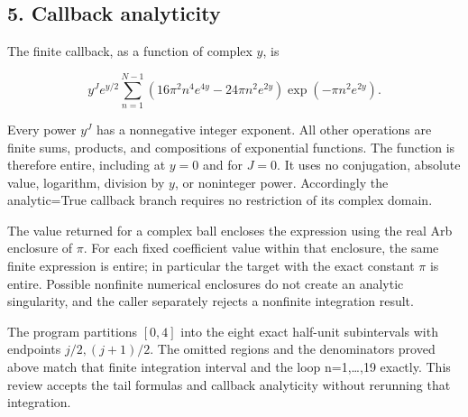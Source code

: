 \subsection{5. Callback analyticity}\label{callback-analyticity}

The finite callback, as a function of complex \(y\), is

\[
y^Je^{y/2}
\sum_{n=1}^{N-1}
\left(16\pi^2n^4e^{4y}-24\pi n^2e^{2y}\right)
\exp(-\pi n^2e^{2y}).
\tag{TT12}
\]

Every power \(y^J\) has a nonnegative integer exponent. All other operations are finite sums, products, and compositions of exponential functions. The function is therefore entire, including at \(y=0\) and for \(J=0\). It uses no conjugation, absolute value, logarithm, division by \(y\), or noninteger power. Accordingly the analytic=True callback branch requires no restriction of its complex domain.

The value returned for a complex ball encloses the expression using the real Arb enclosure of \(\pi\). For each fixed coefficient value within that enclosure, the same finite expression is entire; in particular the target with the exact constant \(\pi\) is entire. Possible nonfinite numerical enclosures do not create an analytic singularity, and the caller separately rejects a nonfinite integration result.

The program partitions \([0,4]\) into the eight exact half-unit subintervals with endpoints \(j/2,(j+1)/2\). The omitted regions and the denominators proved above match that finite integration interval and the loop n=1,\ldots,19 exactly. This review accepts the tail formulas and callback analyticity without rerunning that integration.
